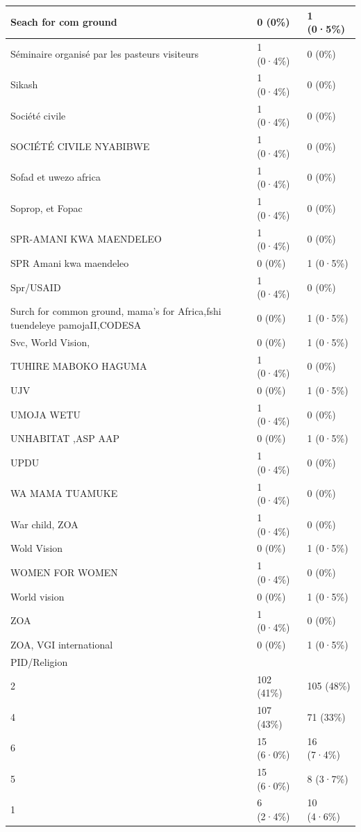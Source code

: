 \documentclass[
]{book}
\begin{document}
\begin{tabular}{l|l|l}
\hline
Seach for com ground & 0 (0\%) & 1 (0·5\%)\\
\hline
Séminaire organisé par les pasteurs visiteurs & 1 (0·4\%) & 0 (0\%)\\
\hline
Sikash & 1 (0·4\%) & 0 (0\%)\\
\hline
Société civile & 1 (0·4\%) & 0 (0\%)\\
\hline
SOCIÉTÉ CIVILE NYABIBWE & 1 (0·4\%) & 0 (0\%)\\
\hline
Sofad et uwezo africa & 1 (0·4\%) & 0 (0\%)\\
\hline
Soprop, et Fopac & 1 (0·4\%) & 0 (0\%)\\
\hline
SPR-AMANI KWA MAENDELEO & 1 (0·4\%) & 0 (0\%)\\
\hline
SPR Amani kwa maendeleo & 0 (0\%) & 1 (0·5\%)\\
\hline
Spr/USAID & 1 (0·4\%) & 0 (0\%)\\
\hline
Surch for common ground, mama's for Africa,fshi tuendeleye pamojaII,CODESA & 0 (0\%) & 1 (0·5\%)\\
\hline
Svc, World Vision, & 0 (0\%) & 1 (0·5\%)\\
\hline
TUHIRE MABOKO HAGUMA & 1 (0·4\%) & 0 (0\%)\\
\hline
UJV & 0 (0\%) & 1 (0·5\%)\\
\hline
UMOJA WETU & 1 (0·4\%) & 0 (0\%)\\
\hline
UNHABITAT ,ASP AAP & 0 (0\%) & 1 (0·5\%)\\
\hline
UPDU & 1 (0·4\%) & 0 (0\%)\\
\hline
WA MAMA TUAMUKE & 1 (0·4\%) & 0 (0\%)\\
\hline
War child, ZOA & 1 (0·4\%) & 0 (0\%)\\
\hline
Wold Vision & 0 (0\%) & 1 (0·5\%)\\
\hline
WOMEN FOR WOMEN & 1 (0·4\%) & 0 (0\%)\\
\hline
World vision & 0 (0\%) & 1 (0·5\%)\\
\hline
ZOA & 1 (0·4\%) & 0 (0\%)\\
\hline
ZOA, VGI international & 0 (0\%) & 1 (0·5\%)\\
\hline
PID/Religion &  & \\
\hline
2 & 102 (41\%) & 105 (48\%)\\
\hline
4 & 107 (43\%) & 71 (33\%)\\
\hline
6 & 15 (6·0\%) & 16 (7·4\%)\\
\hline
5 & 15 (6·0\%) & 8 (3·7\%)\\
\hline
1 & 6 (2·4\%) & 10 (4·6\%)\\

\end{tabular}
\end{document}
